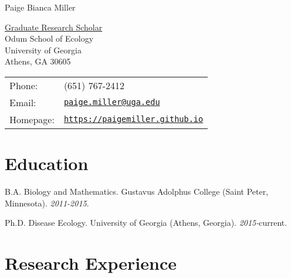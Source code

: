 \documentclass[letterpaper]{article}
\def\name{Paige Bianca Miller}
\renewenvironment{itemize}{
  \begin{list}{}{
    \setlength{\leftmargin}{1.5em}
  }
}{
  \end{list}
}
\begin{document}
{\huge \name}


\vspace{0.25in}

\begin{minipage}{0.45\linewidth}
  \href{}{Graduate Research Scholar} \\
  Odum School of Ecology \\
  University of Georgia \\
  Athens, GA 30605
\end{minipage}
\begin{minipage}{0.45\linewidth}
  \begin{tabular}{ll}
    Phone: & (651) 767-2412 \\
    Email: & \href{mailto:paige.miller@uga.edu}{\tt paige.miller@uga.edu} \\
    Homepage: & \href{https://paigemiller.github.io}{\tt https://paigemiller.github.io} \\
  \end{tabular}
\end{minipage}

\section*{Education}

\begin{itemize}
  \item B.A. Biology and Mathematics. Gustavus Adolphus College (Saint Peter, Minnesota). \textit{2011-2015}.

  \item Ph.D. Disease Ecology. University of Georgia (Athens, Georgia). \textit{2015-}current.
\end{itemize}

\section*{Research Experience}
\end{document}
